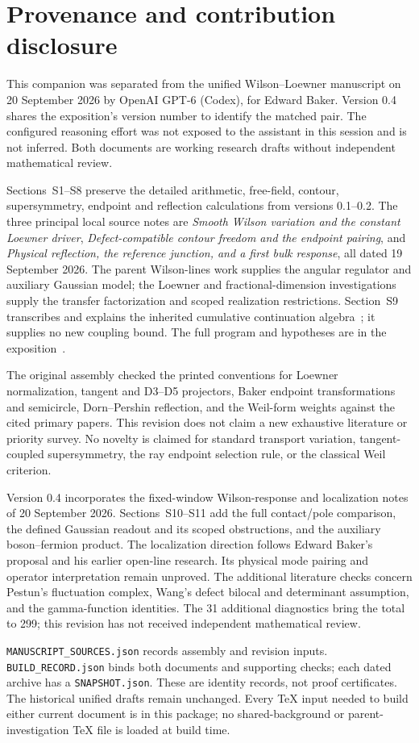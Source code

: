 \section{Provenance and contribution disclosure}\label{app:provenance}

This companion was separated from the unified Wilson--Loewner
manuscript on 20 September 2026 by OpenAI GPT-6 (Codex), for
Edward Baker. Version 0.4 shares the exposition's version number
to identify the matched pair. The configured reasoning effort
was not exposed to the assistant in this session and is not
inferred. Both documents are working research drafts without
independent mathematical review.

Sections~S1--S8 preserve the detailed arithmetic, free-field,
contour, supersymmetry, endpoint and reflection calculations from
versions 0.1--0.2. The three principal local source notes are
\emph{Smooth Wilson variation and the constant Loewner driver},
\emph{Defect-compatible contour freedom and the endpoint pairing},
and \emph{Physical reflection, the reference junction, and a first
bulk response}, all dated 19 September 2026. The parent
Wilson-lines work supplies the angular regulator and auxiliary
Gaussian model; the Loewner and fractional-dimension investigations
supply the transfer factorization and scoped realization restrictions.
Section~S9 transcribes and explains the inherited cumulative
continuation algebra~\cite{CumulativePath}; it supplies no new
coupling bound. The full program and hypotheses are in the
exposition~\cite{Exposition}.

The original assembly checked the printed conventions for Loewner
normalization, tangent and D3--D5 projectors, Baker endpoint
transformations and semicircle, Dorn--Pershin reflection, and the
Weil-form weights against the cited primary papers. This revision
does not claim a new exhaustive literature or priority survey.
No novelty is claimed for standard transport variation,
tangent-coupled supersymmetry, the ray endpoint selection rule,
or the classical Weil criterion.

Version 0.4 incorporates the fixed-window Wilson-response and
localization notes of 20 September 2026. Sections~S10--S11 add the
full contact/pole comparison, the defined Gaussian readout and its
scoped obstructions, and the auxiliary boson--fermion product.
The localization direction follows Edward Baker's proposal and
his earlier open-line research. Its physical mode pairing and
operator interpretation remain unproved. The additional literature
checks concern Pestun's fluctuation complex, Wang's defect bilocal
and determinant assumption, and the gamma-function identities.
The 31 additional diagnostics bring the total to 299; this revision
has not received independent mathematical review.

\nolinkurl{MANUSCRIPT_SOURCES.json} records assembly and revision
inputs. \nolinkurl{BUILD_RECORD.json} binds both documents and
supporting checks; each dated archive has a
\nolinkurl{SNAPSHOT.json}. These are identity records, not proof
certificates. The historical unified drafts remain unchanged.
Every TeX input needed to build either current document is in this
package; no shared-background or parent-investigation TeX file is
loaded at build time.
